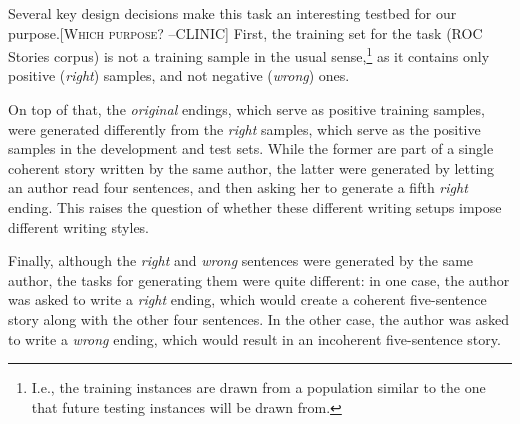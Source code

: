 \documentclass[11pt,a4paper]{article}
\newcommand{\resolved}[1]{}
\newcommand{\yc}[1]{{\color{bblue}\{\textit{#1}\}$_{yc}$}}
\newcommand{\nascomment}[1]{{\color{blue}\textsc{[#1 --nas]}}}
\newcommand{\clinic}[1]{{\color{magenta}\textsc{[#1 --CLINIC]}}}
\begin{document}
Several key design decisions make this task an interesting testbed for our purpose.\clinic{Which purpose?}
First, the training set for the task (ROC Stories corpus) is not a
training sample in the usual sense,\footnote{I.e., the training
  instances are drawn from a population similar to the one that future
  testing instances will be drawn from.}  as it contains only positive ({\it right}) samples, and not negative ({\it wrong}) ones. 
 \resolved{\yc{As far as I understand, this was intentional --- they didn't want
  people to pick up on random superfluous cues that can inevidently
  get into the data creation process, exactly the kind that our work
  picks up. Given that, stating this can be viewed as
  misunderstanding, I'm afraid.} \nascomment{We should maybe say that
  they did this intentionally and concede that our approach goes
  against the intentions of their task design.  But a task that
  insists that systems avoid using features that might encode one kind
of information (like style) is absurd.  Alternately, we could reframe
this not as ``things weren't controlled for'' but instead stick to the
facts here and just describe what they did without judgment.}}

On top of that, the {\it original} endings, which serve as positive training samples, were generated differently from the {\it right} samples, which serve as the positive samples in the development and test sets. 
While the former are part of a single coherent story written by the same author, the latter were generated by letting an author read four sentences, 
and then asking her to generate a fifth {\it right} ending. 
This raises the question of whether these different writing setups impose different writing styles. 

Finally, although the {\it right} and {\it wrong} sentences were generated by the same author, 
the tasks for generating them were quite different: in one case, the author was asked to write a {\it right} ending, which would create a coherent five-sentence story along with the other four sentences. In the other case, the author was asked to write a {\it wrong} ending, which would result in an incoherent five-sentence story. 
 \resolved{In this work, we show that these differences are significant and
impose different writing styles on authors. \nascomment{this bit feels
  a little heavy and reptititive.}}
\end{document}
